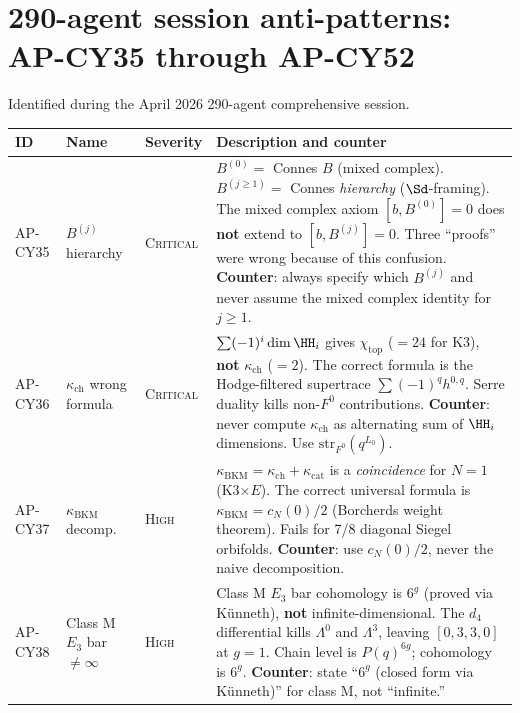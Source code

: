 \section{290-agent session anti-patterns: AP-CY35 through AP-CY52}
\label{sec:ap-cy35-52-full}

Identified during the April 2026 290-agent comprehensive session.

{%
\small
\begin{longtable}{@{}p{1.6cm}p{2.4cm}lp{7.4cm}@{}}
\toprule
\textbf{ID} & \textbf{Name} & \textbf{Severity}
  & \textbf{Description and counter} \\
\midrule
\endhead
AP-CY35 & $B^{(j)}$ hierarchy & \textsc{Critical} &
  $B^{(0)} = $ Connes $B$ (mixed complex).
  $B^{(j \ge 1)} = $ Connes \emph{hierarchy} ($\Sd$-framing).
  The mixed complex axiom $[b, B^{(0)}] = 0$ does \textbf{not}
  extend to $[b, B^{(j)}] = 0$.
  Three ``proofs'' were wrong because of this confusion.
  \textbf{Counter}: always specify which $B^{(j)}$ and never
  assume the mixed complex identity for $j \ge 1$. \\
\midrule
AP-CY36 & $\kappa_{\mathrm{ch}}$ wrong formula & \textsc{Critical} &
  $\sum (-1)^i \dim \HH_i$ gives $\chi_{\mathrm{top}}$
  ($= 24$ for K3), \textbf{not} $\kappa_{\mathrm{ch}}$ ($= 2$).
  The correct formula is the Hodge-filtered supertrace
  $\sum (-1)^q h^{0,q}$.  Serre duality kills non-$F^0$
  contributions.
  \textbf{Counter}: never compute $\kappa_{\mathrm{ch}}$ as
  alternating sum of $\HH_i$ dimensions.  Use
  $\mathrm{str}_{F^0}(q^{L_0})$. \\
\midrule
AP-CY37 & $\kappa_{\mathrm{BKM}}$ decomp.\ & \textsc{High} &
  $\kappa_{\mathrm{BKM}} = \kappa_{\mathrm{ch}} +
  \kappa_{\mathrm{cat}}$ is a \emph{coincidence} for $N = 1$
  (K3$\times E$).  The correct universal formula is
  $\kappa_{\mathrm{BKM}} = c_N(0)/2$ (Borcherds weight theorem).
  Fails for 7/8 diagonal Siegel orbifolds.
  \textbf{Counter}: use $c_N(0)/2$, never the naive decomposition. \\
\midrule
AP-CY38 & Class M $E_3$ bar $\neq \infty$ & \textsc{High} &
  Class M $E_3$ bar cohomology is $6^g$ (proved via K\"{u}nneth),
  \textbf{not} infinite-dimensional.  The $d_4$ differential
  kills $\Lambda^0$ and $\Lambda^3$, leaving $[0,3,3,0]$ at $g = 1$.
  Chain level is $P(q)^{6g}$; cohomology is $6^g$.
  \textbf{Counter}: state ``$6^g$ (closed form via K\"{u}nneth)''
  for class M, not ``infinite.'' \\

\end{longtable}}
